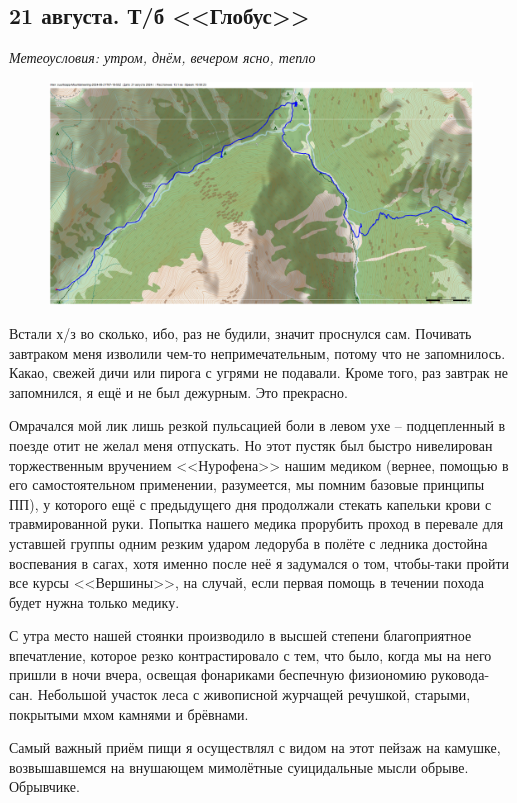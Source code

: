 \subsection{21 августа. Т/б <<Глобус>>}

\textit{Метеоусловия: утром, днём, вечером ясно, тепло}


\begin{figure}[h!]
	\centering
	\includegraphics[angle=0, width=0.7\linewidth]{../pics/mini_maps/21}
	\label{fig:mini_21}
\end{figure}

Встали х/з во сколько, ибо, раз не будили, значит проснулся сам. Почивать завтраком меня изволили чем-то непримечательным, потому что не запомнилось. Какао, свежей дичи или пирога с угрями не подавали. Кроме того, раз завтрак не запомнился, я ещё и не был дежурным. Это прекрасно.

Омрачался мой лик лишь резкой пульсацией боли в левом ухе – подцепленный в поезде отит не желал меня отпускать. Но этот пустяк был быстро нивелирован торжественным вручением <<Нурофена>> нашим медиком (вернее, помощью в его самостоятельном применении, разумеется, мы помним базовые принципы ПП), у которого ещё с предыдущего дня продолжали стекать капельки крови с травмированной руки. Попытка нашего медика прорубить проход в перевале для уставшей группы одним резким ударом ледоруба в полёте с ледника достойна воспевания в сагах, хотя именно после неё я задумался о том, чтобы-таки пройти все курсы <<Вершины>>, на случай, если первая помощь в течении похода будет нужна только медику.

С утра место нашей стоянки производило в высшей степени благоприятное впечатление, которое резко контрастировало с тем, что было, когда мы на него пришли в ночи вчера, освещая фонариками беспечную физиономию руковода-сан. Небольшой участок леса с живописной журчащей речушкой, старыми, покрытыми мхом камнями и брёвнами.

Самый важный приём пищи я осуществлял с видом на этот пейзаж на камушке, возвышавшемся на внушающем мимолётные суицидальные мысли обрыве. Обрывчике.

